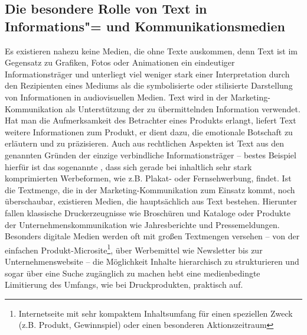 \subsection{Die besondere Rolle von Text in Informations"= und Kommunikationsmedien}\label{l:besondererolle}

Es existieren nahezu keine Medien, die ohne Texte auskommen, denn Text ist im Gegensatz zu Grafiken, Fotos oder Animationen ein eindeutiger Informationsträger und unterliegt viel weniger stark einer Interpretation durch den Rezipienten eines Mediums als die symbolisierte oder stilisierte Darstellung von Informationen in audiovisuellen Medien. Text wird in der Marketing-Kommunikation als Unterstützung der zu übermittelnden Information verwendet. Hat man die Aufmerksamkeit des Betrachter eines Produkts erlangt, liefert Text weitere Informationen zum Produkt, er dient dazu, die emotionale Botschaft zu erläutern und zu präzisieren. Auch aus rechtlichen Aspekten ist Text aus den genannten Gründen der einzige verbindliche Informationsträger -- bestes Beispiel hierfür ist das sogenannte , dass sich gerade bei inhaltlich sehr stark komprimierten Werbeformen, wie z.B. Plakat- oder Fernsehwerbung, findet. Ist die Textmenge, die in der Marketing-Kommunikation zum Einsatz kommt, noch überschaubar, existieren Medien, die hauptsächlich aus Text bestehen. Hierunter fallen klassische Druckerzeugnisse wie Broschüren und Kataloge oder Produkte der Unternehmenskommunikation wie Jahresberichte und Pressemeldungen. Besonders digitale Medien werden oft mit großen Textmengen versehen -- von der einfachen Produkt-Microsite\footnote{Internetseite mit sehr kompaktem Inhaltsumfang für einen speziellen Zweck (z.B. Produkt, Gewinnspiel) oder einen besonderen Aktionszeitraum}, über Werbemittel wie Newsletter bis zur Unternehmenswebsite -- die Möglichkeit Inhalte hierarchisch zu strukturieren und sogar über eine Suche zugänglich zu machen hebt eine medienbedingte Limitierung des Umfangs, wie bei Druckprodukten, praktisch auf.

